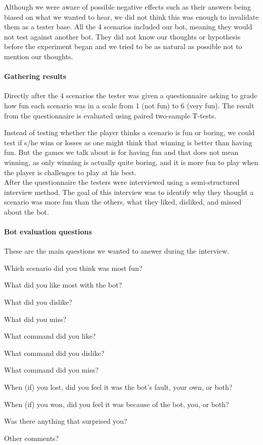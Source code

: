 Although we were aware of possible negative effects such as their answers being biased on what we
wanted to hear, we did not think this was enough to invalidate them as a tester base. All the 4
scenarios included our bot, meaning they would not test against another bot. They did not know our
thoughts or hypothesis before the experiment began and we tried to be as natural as possible not to
mention our thoughts.

\paragraph{Gathering results}
Directly after the 4 scenarios the tester was given a questionnaire asking to grade how fun each
scenario was in a scale from 1 (not fun) to 6 (very fun). The result from the questionnaire is
evaluated using paired two-sample T-tests.

Instead of testing whether the player thinks a scenario is fun or boring, we could test if s/he wins
or losses as one might think that winning is better than having fun. But the games we talk about is
for having fun and that does not mean winning, as only winning is actually quite
boring\cite{hagelback09}, and it is more fun to play when the player is challenges to play at his
best\cite{sweetser05}. \\

After the questionnaire the testers were interviewed using a semi-structured interview method. The
goal of this interview was to identify why they thought a scenario was more fun than the others,
what they liked, disliked, and missed about the bot.

\paragraph{Bot evaluation questions}
These are the main questions we wanted to answer during the interview.
\begin{compactitem}
	\item Which scenario did you think was most fun?
	\item What did you like most with the bot?
	\item What did you dislike?
	\item What did you miss?
	\item What command did you like?
	\item What command did you dislike?
	\item What command did you miss?
	\item When (if) you lost, did you feel it was the bot's fault, your own, or both?
	\item When (if) you won, did you feel it was because of the bot, you, or both?
	\item Was there anything that surprised you?
	\item Other comments?
\end{compactitem}


